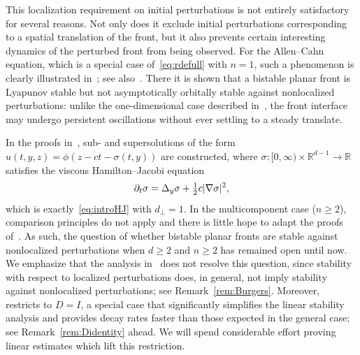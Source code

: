 \documentclass[12pt,oneside,a4paper,reqno]{amsart}
\numberwithin{equation}{section}
\theoremstyle{definition}
\theoremstyle{remark}
\newcommand{\bbR}{{\mathbb R}}
\DeclarePairedDelimiter{\abs}{\lvert}{\rvert}
\begin{document}
This localization requirement on initial perturbations is not entirely satisfactory for several reasons.
Not only does it exclude initial perturbations corresponding to a spatial translation of the front, but it also prevents certain interesting dynamics of the perturbed front from being observed. 
For the Allen--Cahn equation, which is a special case of~\eqref{eq:rdefull} with $n = 1$, such a phenomenon is clearly illustrated in~\cite{matano_stability_2009,matano_large_2011}; see also~\cite{Roquejoffre_nontrivial_2009}. 
There it is shown that a bistable planar front is Lyapunov stable but not asymptotically orbitally stable against nonlocalized perturbations: unlike the one-dimensional case described in~\cite{Fife_approach_1977, Sattinger_stability_1976}, the front interface may undergo persistent oscillations without ever settling to a steady translate.

In the proofs in~\cite{matano_large_2011,matano_stability_2009,Roquejoffre_nontrivial_2009}, sub- and supersolutions of the form $u(t,y,z) = \phi(z - ct - \sigma(t,y))$ are constructed, where $\sigma \colon [0,\infty) \times \bbR^{d-1} \to \bbR$ satisfies the viscous Hamilton--Jacobi equation
\begin{equation*}
	\partial_t \sigma = \Delta_y \sigma + \tfrac{1}{2}c \abs{\nabla \sigma}^2,
\end{equation*}
which is exactly~\eqref{eq:introHJ} with $d_{\bot} = 1$.
In the multicomponent case ($n \geq 2$), comparison principles do not apply and there is little hope to adapt the proofs of~\cite{matano_large_2011,matano_stability_2009,Roquejoffre_nontrivial_2009}. As such, the question of whether bistable planar fronts are stable against nonlocalized perturbations when $d \geq 2$ and $n \geq 2$ has remained open until now. 
We emphasize that the analysis in~\cite{kapitula_multidimensional_1997} does not resolve this question, since stability with respect to localized perturbations does, in general, not imply stability against nonlocalized perturbations; see Remark~\ref{rem:Burgers}.
Moreover,~\cite{kapitula_multidimensional_1997} restricts to $D = I$, a special case that significantly simplifies the linear stability analysis and provides decay rates faster than those expected in the general case; see Remark~\ref{rem:Didentity} ahead.
We will spend considerable effort proving linear estimates which lift this restriction.
\end{document}
